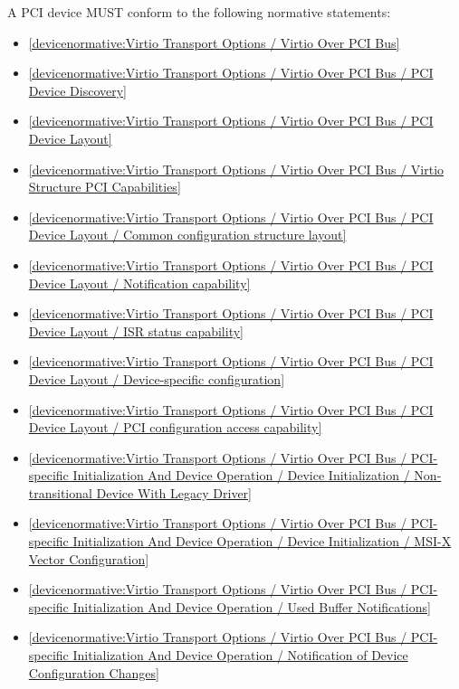\label{sec:Conformance / Device Conformance / PCI Device Conformance}

A PCI device MUST conform to the following normative statements:

\begin{itemize}
\item \ref{devicenormative:Virtio Transport Options / Virtio Over PCI Bus}
\item \ref{devicenormative:Virtio Transport Options / Virtio Over PCI Bus / PCI Device Discovery}
\item \ref{devicenormative:Virtio Transport Options / Virtio Over PCI Bus / PCI Device Layout}
\item \ref{devicenormative:Virtio Transport Options / Virtio Over PCI Bus / Virtio Structure PCI Capabilities}
\item \ref{devicenormative:Virtio Transport Options / Virtio Over PCI Bus / PCI Device Layout / Common configuration structure layout}
\item \ref{devicenormative:Virtio Transport Options / Virtio Over PCI Bus / PCI Device Layout / Notification capability}
\item \ref{devicenormative:Virtio Transport Options / Virtio Over PCI Bus / PCI Device Layout / ISR status capability}
\item \ref{devicenormative:Virtio Transport Options / Virtio Over PCI Bus / PCI Device Layout / Device-specific configuration}
\item \ref{devicenormative:Virtio Transport Options / Virtio Over PCI Bus / PCI Device Layout / PCI configuration access capability}
\item \ref{devicenormative:Virtio Transport Options / Virtio Over PCI Bus / PCI-specific Initialization And Device Operation / Device Initialization / Non-transitional Device With Legacy Driver}
\item \ref{devicenormative:Virtio Transport Options / Virtio Over PCI Bus / PCI-specific Initialization And Device Operation / Device Initialization / MSI-X Vector Configuration}
\item \ref{devicenormative:Virtio Transport Options / Virtio Over PCI Bus / PCI-specific Initialization And Device Operation / Used Buffer Notifications}
\item \ref{devicenormative:Virtio Transport Options / Virtio Over PCI Bus / PCI-specific Initialization And Device Operation / Notification of Device Configuration Changes}
\end{itemize}

